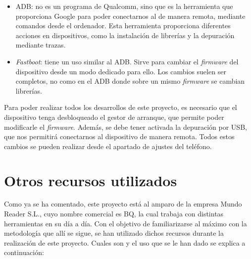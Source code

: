 \begin{itemize}
\begin{figure}[H]
		\label{fig:audition}
	\end{figure}	
	\item{\gls{ADB}: no es un programa de Qualcomm, sino que es la herramienta que proporciona Google para poder conectarnos al de manera remota, mediante comandos desde el ordenador. Esta herramienta proporciona diferentes acciones en dispositivos, como la instalación de librerías y la depuración mediante trazas.}
	\item{\textit{Fastboot}: tiene un uso similar al \gls{ADB}. Sirve para cambiar el \textit{firmware} del dispositivo desde un modo dedicado para ello. Los cambios suelen ser completos, no como en el \gls{ADB} donde sobre un mismo \textit{firmware} se cambian librerías.}
\end{itemize}

Para poder realizar todos los desarrollos de este proyecto, es necesario que el dispositivo tenga desbloqueado el gestor de arranque, que permite poder modificarle el \textit{firmware}. Además, se debe tener activada la depuración por \gls{USB}, que nos permitirá conectarnos al dispositivo de manera remota. Todos estos cambios se pueden realizar desde el apartado de ajustes del teléfono.

\section{Otros recursos utilizados} \label{sec:otros_recursos}
Como ya se ha comentado, este proyecto está al amparo de la empresa Mundo Reader S.L., cuyo nombre comercial es BQ, la cual trabaja con distintas herramientas en su día a día. Con el objetivo de familiarizarse al máximo con la metodología que allí se sigue, se han utilizado dichos recursos durante la realización de este proyecto. Cuales son y el uso que se le han dado se explica a continuación:

